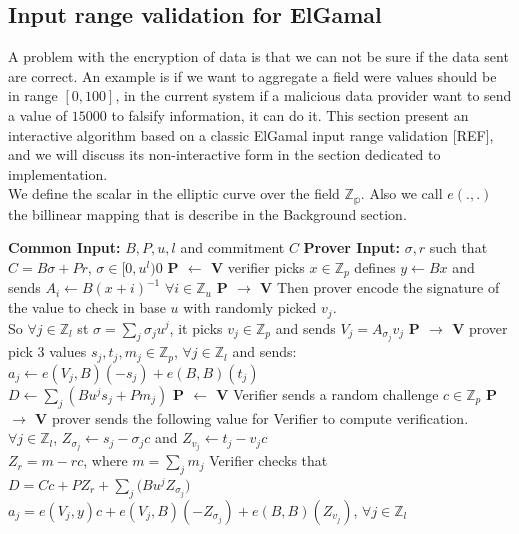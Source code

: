 \documentclass{article}
\begin{document}
\subsection{Input range validation for ElGamal}

A problem with the encryption of data is that we can not be sure if the data sent are correct. An example is if we want to aggregate a field were values should be in range $[0,100]$, in the current system if a malicious data provider want to send a value of $15000$ to falsify information, it can do it. This section present an  interactive algorithm based on a classic ElGamal input range validation [REF], and we will discuss its non-interactive form in the section dedicated to implementation.\\
We define the scalar in the elliptic curve over the field $\mathbb{Z_p}$. Also we call $e(.,.)$ the billinear mapping that is describe in the Background section.
\begin{algorithmic}[1]
\State \textbf{Common Input:} $B, P, u, l$ and commitment $C$
\State \textbf{Prover Input:} $\sigma, r$ such that $C = B\sigma + Pr$, $\sigma \in [0,u^l)0$
\State  \textbf{P $\leftarrow$ V} verifier picks $x \in \mathbb{Z}_p$ defines $y \gets Bx$ and sends $A_i \gets B(x+i)^{-1}$ $ \forall i \in \mathbb{Z}_u$
\State \textbf{P $\rightarrow$ V} Then prover encode the signature of the value to check in base $u$ with randomly picked $v_j$.\\
So $\forall j \in \mathbb{Z}_l $ st $ \sigma = \sum_{j}{\sigma_j u^j}$, it picks $v_j \in \mathbb{Z}_p$ and sends $V_j = A_{\sigma_j}v_j$ 
\State \textbf{P $\rightarrow$ V} prover pick 3 values $s_j,t_j,m_j \in \mathbb{Z}_p $, $\forall j \in \mathbb{Z}_l$ and sends:\\
$a_j \gets e(V_j,B)(-s_j)+e(B,B)(t_j)$\\
$D \gets \sum_{j}{(Bu^j s_j + Pm_j)}$
\State \textbf{P $\leftarrow$ V} Verifier sends a random challenge $c \in \mathbb{Z}_p$
\State \textbf{P $\rightarrow$ V} prover sends the following value for Verifier to compute verification.\\
$ \forall j \in \mathbb{Z}_l$, $Z_{\sigma_j} \gets s_j-\sigma_j c$ and $Z_{v_j} \gets t_j-v_j c$\\
$Z_r = m -rc $, where $m = \sum_{j}{m_j}$
\State Verifier checks that $D = Cc + PZ_r + \sum_{j}{(Bu^j Z_{\sigma_j}}) $\\
$a_j = e(V_j,y)c + e(V_j,B)(-Z_{\sigma_j}) + e(B,B)(Z_{v_j})$, $\forall j \in \mathbb{Z}_l$
\end{algorithmic}
\end{document}
